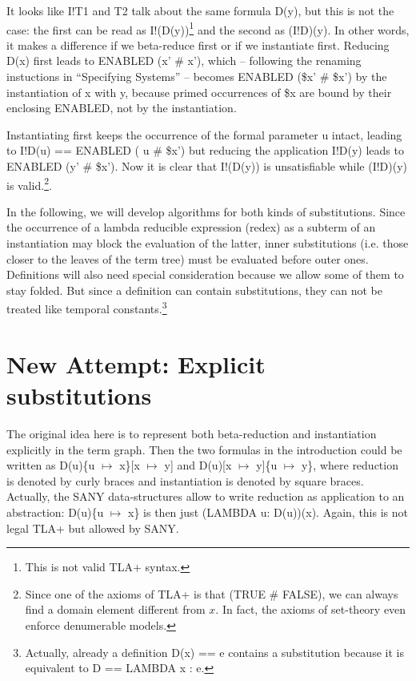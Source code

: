 \documentclass[a4paper]{article}
\newcommand{\tlaplus}[0]{{TLA+}}
\newcommand{\tla}[1]{#1}
\begin{document}
\vspace{2mm}
\noindent
It looks like \tla{I!T1} and \tla{T2} talk about the same formula \tla{D(y)},
 but this is not the case: the first can be read as \tla{I!(D(y))}\footnote{This
 is not valid \tlaplus{} syntax.} and the second as \tla{(I!D)(y)}. In other
 words, it makes a difference if we beta-reduce first or if we instantiate
 first. Reducing D(x) first leads to \tla{ENABLED (x' \# x')}, which --
 following the renaming instuctions in ``Specifying Systems'' -- becomes
 \tla{ENABLED (\$x' \# \$x')} by the instantiation of \tla{x} with \tla{y},
 because primed occurrences of \tla{\$x} are bound by their enclosing ENABLED,
 not by the instantiation.

Instantiating first keeps the occurrence of the  formal parameter \tla{u} intact,
 leading to \tla{I!D(u) == ENABLED ( u \# \$x') } but reducing the application
 \tla{I!D(y)} leads to \tla{ENABLED (y' \# \$x')}. Now it is clear that
 \tla{I!(D(y))} is unsatisfiable while \tla{(I!D)(y)} is valid.\footnote{ Since
   one of the axioms  of \tlaplus{} is that (TRUE \# FALSE), we can always find
   a domain element different from $x$. In fact, the axioms of set-theory even
   enforce denumerable models.}.

In the following, we will develop algorithms for both kinds of substitutions.
 Since the occurrence of a lambda reducible expression (redex) as a subterm of
 an instantiation may block the evaluation of the latter, inner substitutions
 (i.e. those closer to the leaves of the term tree) must be evaluated before
 outer ones. Definitions will also need special consideration because
 we allow some of them to stay folded. But since a definition can contain
 substitutions, they can not be treated like temporal constants.\footnote{
   Actually, already a definition \tla{D(x) == e} contains a substitution
   because it is equivalent to D == LAMBDA x : e.
 }

\section{New Attempt: Explicit substitutions}

The original idea here is to represent both beta-reduction and instantiation
 explicitly in the term graph. Then the two formulas in the introduction
 could be written as D(u)\{u $\mapsto$ x\}[x $\mapsto$ y] and
 D(u)[x $\mapsto$ y]\{u $\mapsto$ y\}, where reduction is denoted by curly
 braces and instantiation is denoted by square braces. Actually, the SANY
 data-structures allow to write reduction as application to an abstraction:
 D(u)\{u $\mapsto$ x\} is then just \tla{(LAMBDA u: D(u))(x)}. Again, this
 is not legal \tlaplus{} but allowed by SANY.
\end{document}
